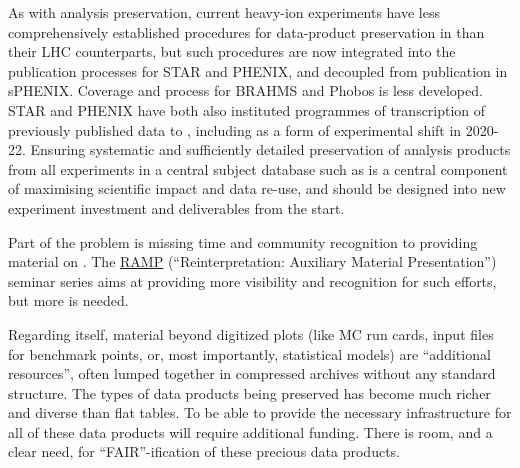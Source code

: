 \documentclass[11pt]{article}
\begin{document}
As with analysis preservation, current heavy-ion experiments have less comprehensively established procedures for data-product preservation in \hepdata than their LHC counterparts, but such procedures are now integrated into the publication processes for STAR and PHENIX, and decoupled from publication in sPHENIX. Coverage and process for BRAHMS and Phobos is less developed. STAR and PHENIX have both also instituted programmes of transcription of previously published data to \hepdata, including as a form of experimental shift in 2020-22. Ensuring systematic and sufficiently detailed preservation of analysis products from all experiments in a central subject database such as \hepdata is a central component of maximising scientific impact and data re-use, and should be designed into new experiment investment and deliverables from the start.

Part of the problem is missing time and community recognition to providing material on \hepdata.
The \href{https://indico.cern.ch/category/14155/}{RAMP} (``Reinterpretation: Auxiliary Material Presentation'') seminar series aims at providing more visibility and recognition for such efforts,  but more is needed. 

Regarding \hepdata itself, material beyond digitized plots (like MC run cards, input files for benchmark points, or, most importantly, statistical models) are ``additional resources'', often lumped together in compressed archives without any standard structure.
The types of data products being preserved has become much richer and diverse than flat tables.
To be able to provide the necessary infrastructure for all of these data products will require additional funding.
There is room, and a clear need, for ``FAIR''-ification of these precious data products. 
\end{document}
